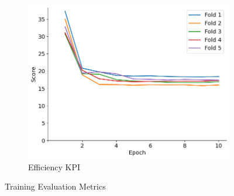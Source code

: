 \documentclass{report} %
\begin{document}
\begin{figure}[H]
    \begin{subfigure}{0.32\textwidth}
        \centering
        \includegraphics[width=\textwidth]{./ReportImages/train_score_y2.png}
        \caption{\centering Efficiency \ac{KPI}}
        \label{fig:Training Score for Efficiency grid}
    \end{subfigure}
    \caption{Training Evaluation Metrics}
    \label{fig:Training Evaluation Metrics}
\end{figure}
\end{document}
